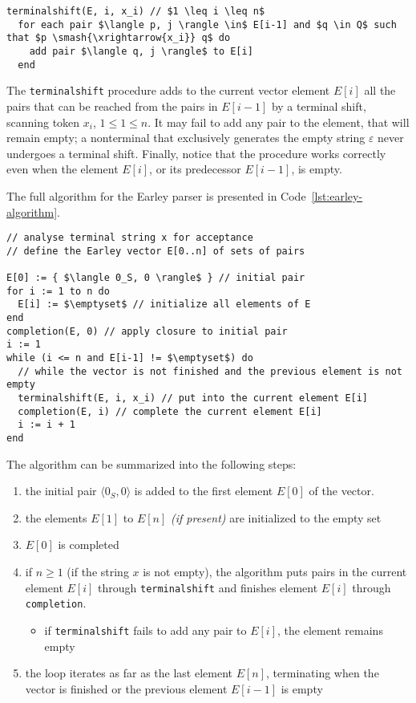 \documentclass[english]{article}
\begin{document}
\begin{lstlisting}[caption={\texttt{terminalshift} procedure}, label={lst:earley-terminalshift}]
terminalshift(E, i, x_i) // $1 \leq i \leq n$
  for each pair $\langle p, j \rangle \in$ E[i-1] and $q \in Q$ such that $p \smash{\xrightarrow{x_i}} q$ do
    add pair $\langle q, j \rangle$ to E[i]
  end
\end{lstlisting}

The \texttt{terminalshift} procedure adds to the current vector element \(E[i]\) all the pairs that can be reached from the pairs in \(E[i-1]\) by a terminal shift, scanning token \(x_i\), \(1 \leq 1 \leq n\).
It may fail to add any pair to the element, that will remain empty;
a nonterminal that exclusively generates the empty string \(\varepsilon\) never undergoes a terminal shift.
Finally, notice that the procedure works correctly even when the element \(E[i]\), or its predecessor \(E[i-1]\), is empty.

The full algorithm for the Earley parser is presented in Code~\ref{lst:earley-algorithm}.

\begin{lstlisting}[caption={Earley's Algorithm}, label={lst:earley-algorithm}]
// analyse terminal string x for acceptance
// define the Earley vector E[0..n] of sets of pairs

E[0] := { $\langle 0_S, 0 \rangle$ } // initial pair
for i := 1 to n do
  E[i] := $\emptyset$ // initialize all elements of E
end
completion(E, 0) // apply closure to initial pair
i := 1
while (i <= n and E[i-1] != $\emptyset$) do
  // while the vector is not finished and the previous element is not empty
  terminalshift(E, i, x_i) // put into the current element E[i]
  completion(E, i) // complete the current element E[i]
  i := i + 1
end
\end{lstlisting}

The algorithm can be summarized into the following steps:
\begin{enumerate}
  \item the initial pair \(\langle 0_S, 0 \rangle\) is added to the first element \(E[0]\) of the vector.
  \item the elements \(E[1]\) to \(E[n]\) \textit{(if present)} are initialized to the empty set
  \item \(E[0]\) is completed
  \item if \(n \geq 1\) (if the string \(x\) is not empty), the algorithm puts pairs in the current element \(E[i]\) through \texttt{terminalshift} and finishes element \(E[i]\) through \texttt{completion}.
        \begin{itemize}[label=\(\rightarrow\)]
          \item if \texttt{terminalshift} fails to add any pair to \(E[i]\), the element remains empty
        \end{itemize}
  \item the loop iterates as far as the last element \(E[n]\), terminating when the vector is finished or the previous element \(E[i-1]\) is empty
\end{enumerate}
\end{document}
